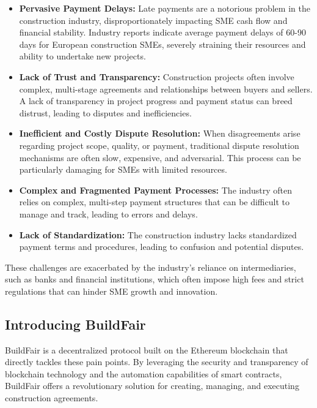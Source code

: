 \documentclass[12pt]{article}
\begin{document}
\begin{itemize}
    \item \textbf{Pervasive Payment Delays:} Late payments are a notorious problem in the construction industry, disproportionately impacting SME cash flow and financial stability. Industry reports indicate average payment delays of 60-90 days for European construction SMEs\cite{construction_standards}, severely straining their resources and ability to undertake new projects.
    \item \textbf{Lack of Trust and Transparency:} Construction projects often involve complex, multi-stage agreements and relationships between buyers and sellers. A lack of transparency in project progress and payment status can breed distrust, leading to disputes and inefficiencies\cite{european_market_report}.
    \item \textbf{Inefficient and Costly Dispute Resolution:} When disagreements arise regarding project scope, quality, or payment, traditional dispute resolution mechanisms are often slow, expensive, and adversarial. This process can be particularly damaging for SMEs with limited resources.
    \item \textbf{Complex and Fragmented Payment Processes:} The industry often relies on complex, multi-step payment structures that can be difficult to manage and track, leading to errors and delays.
    \item \textbf{Lack of Standardization:} The construction industry lacks standardized payment terms and procedures, leading to confusion and potential disputes.
\end{itemize}

These challenges are exacerbated by the industry's reliance on intermediaries, such as banks and financial institutions, which often impose high fees and strict regulations that can hinder SME growth and innovation.

\subsection{Introducing BuildFair}
BuildFair is a decentralized protocol built on the Ethereum blockchain that directly tackles these pain points. By leveraging the security and transparency of blockchain technology and the automation capabilities of smart contracts, BuildFair offers a revolutionary solution for creating, managing, and executing construction agreements.
\end{document}
